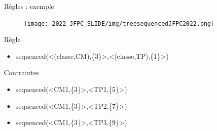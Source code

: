 \documentclass{beamer}
\begin{document}


\begin{frame}{Règles : exemple}
    \begin{figure}
        \centering
        \texttt{[image: 2022\_JFPC\_SLIDE/img/treesequencedJFPC2022.png]}
        \label{fig:rules2}
    \end{figure}
    \begin{minipage}{0.5\textwidth}
    \begin{block}{\tiny Règle}
        \begin{itemize}
            \item {\tiny sequenced(<(classe,CM),\{3\}>,<(classe,TP),\{1\}>)} 
        \end{itemize}
    \end{block}
    \end{minipage}
    \hfill
    \begin{minipage}{0.45\textwidth}
     \begin{alertblock}{\tiny Contraintes}
        \begin{itemize}
        \item {\tiny sequenced(<CM1,\{3\}>,<TP1,\{5\}>)}
        \item {\tiny sequenced(<CM1,\{3\}>,<TP2,\{7\}>)}
        \item {\tiny sequenced(<CM1,\{3\}>,<TP3,\{9\}>)}
    
        \end{itemize}
        \end{alertblock}
    \end{minipage}
\end{frame}
\end{document}
